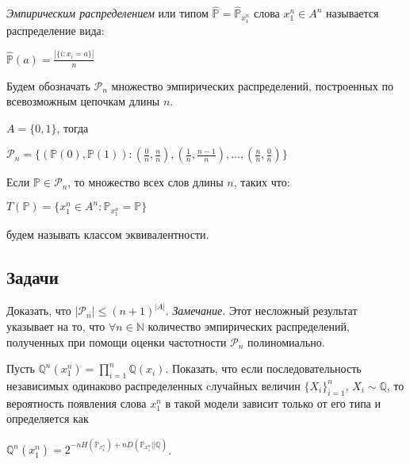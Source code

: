 \begin{definition} 
\textit{Эмпирическим распределением} или типом $\hat{\mathbb{P}} = \hat{\mathbb{P}}_{x_1^n}$ слова $x_1^n\in A^n$ называется распределение вида:
\begin{center}
$\hat{\mathbb{P}}(a) = \frac{|\{i : x_i = a\}| }{n}$
\end{center}  
\end{definition}

\begin{definition} 
Будем обозначать $\mathcal{P}_n$ множество эмпирических распределений, построенных по всевозможным цепочкам длины $n$.
\end{definition}

\begin{example}
$A = \{0, 1\}$, тогда
\begin{center}
$\mathcal{P}_n = \{(\mathbb{P}(0), \mathbb{P}(1)) : (\frac{0}{n} , \frac{n}{n}), (\frac{1}{n}, \frac{n-1}{n}), ..., (\frac{n}{n}, \frac{0}{n})\}$
\end{center}
\end{example}

\begin{definition} 
Если $\mathbb{P} \in \mathcal{P}_n$, то множество всех слов длины $n$, таких что:
\begin{center}
$T(\mathbb{P}) = \{x_1^n \in A^n: \mathbb{P}_{x_1^n} = \mathbb{P}\}$
\end{center}
будем называть классом эквивалентности.
\end{definition}

\subsection{Задачи}

\begin{problem}
Доказать, что $|\mathcal{P}_n| \leq (n+1)^{|A|}$.
\textit{Замечание.} Этот несложный результат указывает на то, что $\forall n \in \mathbb{N}$ количество эмпирических распределений, полученных при помощи оценки частотности $\mathcal{P}_n$ полиномиально. 
\end{problem}

\begin{problem}
Пусть $\mathbb{Q}^n(x_1^n) = \prod_{i = 1}^{n} \mathbb{Q}(x_i)$. Показать, что если последовательность независимых одинаково распределенных cлучайных величин $\{X_i\}_{i = 1}^n$, $X_i \sim \mathbb{Q}$, то вероятность появления слова $x_1^n$ в такой модели зависит только от его типа и определяется как
\begin{center}
$\mathbb{Q}^n(x_1^n) = 2^{-nH(\mathbb{P}_{x_1^n}) + nD(\mathbb{P}_{x_1^n}||\mathbb{Q})}$.
\end{center}   
\end{problem}


